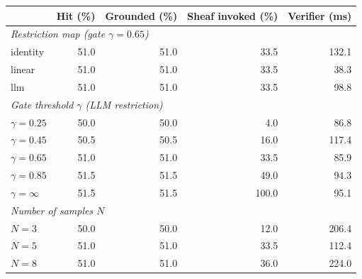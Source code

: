 \begin{tabular}{lrrrr}
\toprule
 & Hit (\%) & Grounded (\%) & Sheaf invoked (\%) & Verifier (ms) \\
\midrule
\multicolumn{5}{l}{\textit{Restriction map (gate $\gamma=0.65$)}} \\
\quad identity & 51.0 & 51.0 & 33.5 & 132.1 \\
\quad linear & 51.0 & 51.0 & 33.5 & 38.3 \\
\quad llm & 51.0 & 51.0 & 33.5 & 98.8 \\
\midrule
\multicolumn{5}{l}{\textit{Gate threshold $\gamma$ (LLM restriction)}} \\
\quad $\gamma=0.25$ & 50.0 & 50.0 & 4.0 & 86.8 \\
\quad $\gamma=0.45$ & 50.5 & 50.5 & 16.0 & 117.4 \\
\quad $\gamma=0.65$ & 51.0 & 51.0 & 33.5 & 85.9 \\
\quad $\gamma=0.85$ & 51.5 & 51.5 & 49.0 & 94.3 \\
\quad $\gamma=\infty$ & 51.5 & 51.5 & 100.0 & 95.1 \\
\midrule
\multicolumn{5}{l}{\textit{Number of samples $N$}} \\
\quad $N=3$ & 50.0 & 50.0 & 12.0 & 206.4 \\
\quad $N=5$ & 51.0 & 51.0 & 33.5 & 112.4 \\
\quad $N=8$ & 51.0 & 51.0 & 36.0 & 224.0 \\
\bottomrule
\end{tabular}